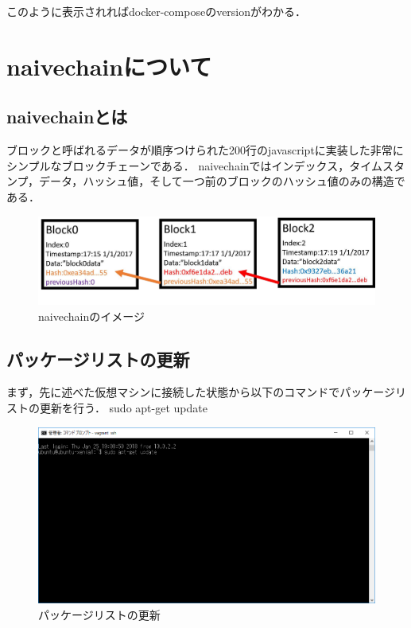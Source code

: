 このように表示されればdocker-composeのversionがわかる．



\newpage


\section{naivechainについて}

\subsection{naivechainとは}
ブロックと呼ばれるデータが順序つけられた200行のjavascriptに実装した非常にシンプルなブロックチェーンである．
naivechainではインデックス，タイムスタンプ，データ，ハッシュ値，そして一つ前のブロックのハッシュ値のみの構造である．
\begin{figure}[h]
\centering
\includegraphics[width=12cm]{naivechain.pdf}
\caption{naivechainのイメージ}\label{サンプル図}
\end{figure}

\newpage





\subsection{パッケージリストの更新}
まず，先に述べた仮想マシンに接続した状態から以下のコマンドでパッケージリストの更新を行う．
sudo apt-get update

\begin{figure}[h]
\centering
\includegraphics[width=12cm]{sudoaptupdate.PNG}
\caption{パッケージリストの更新}\label{サンプル図}
\end{figure}

